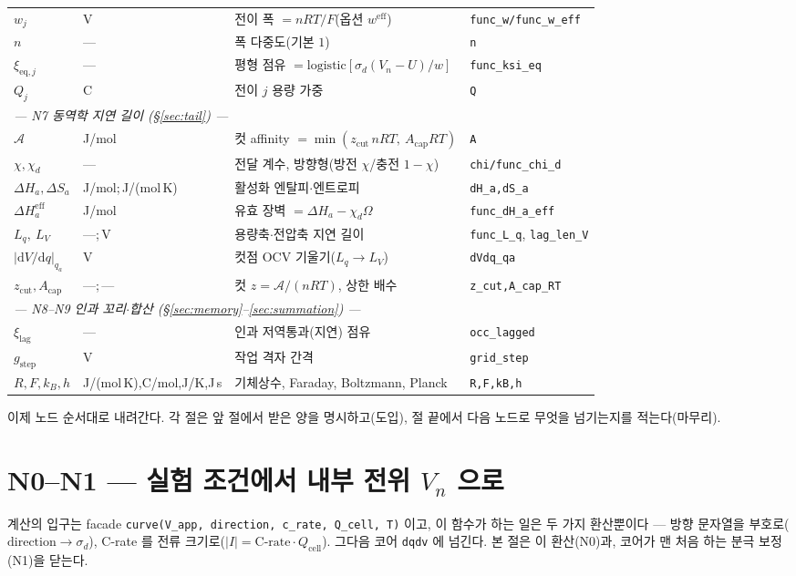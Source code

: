 \documentclass[11pt,a4paper]{article}
\newcommand{\dd}{\mathrm{d}}
\newcommand{\eff}{\mathrm{eff}}
\newcommand{\eq}{\mathrm{eq}}
\newcommand{\cell}{\mathrm{cell}}
\newcommand{\lag}{\mathrm{lag}}
\newcommand{\code}[1]{\texttt{#1}}
\begin{document}
\begin{longtable}{p{} p{} p{} p{}}
$w_j$ & V & 전이 폭 $=nRT/F$(옵션 $w^\eff$) & \code{func\_w/func\_w\_eff} \\
$n$ & --- & 폭 다중도(기본 $1$) & \code{n} \\
$\xi_{\eq,j}$ & --- & 평형 점유 $=\mathrm{logistic}[\sigma_d(V_n-U)/w]$ & \code{func\_ksi\_eq} \\
$Q_j$ & C & 전이 $j$ 용량 가중 & \code{Q} \\
\multicolumn{4}{l}{\emph{— N7 동역학 지연 길이 (§\ref{sec:tail}) —}}\\
$\mathcal A$ & J/mol & 컷 affinity $=\min(z_\mathrm{cut}\,nRT,\ A_\mathrm{cap}RT)$ & \code{A} \\
$\chi,\chi_d$ & --- & 전달 계수, 방향형(방전 $\chi$/충전 $1-\chi$) & \code{chi/func\_chi\_d} \\
$\Delta H_a,\Delta S_a$ & {\footnotesize J/mol;\,J/(mol\,K)} & 활성화 엔탈피$\cdot$엔트로피 & \code{dH\_a,dS\_a} \\
$\Delta H_a^\eff$ & J/mol & 유효 장벽 $=\Delta H_a-\chi_d\Omega$ & \code{func\_dH\_a\_eff} \\
$L_q,\ L_V$ & ---;\,V & 용량축$\cdot$전압축 지연 길이 & \code{func\_L\_q}, \code{lag\_len\_V} \\
$|\dd V/\dd q|_{q_a}$ & V & 컷점 OCV 기울기($L_q\!\to\!L_V$) & \code{dVdq\_qa} \\
$z_\mathrm{cut},A_\mathrm{cap}$ & ---;\,--- & 컷 $z=\mathcal A/(nRT)$, 상한 배수 & \code{z\_cut,A\_cap\_RT} \\
\multicolumn{4}{l}{\emph{— N8--N9 인과 꼬리$\cdot$합산 (§\ref{sec:memory}--\ref{sec:summation}) —}}\\
$\xi_\lag$ & --- & 인과 저역통과(지연) 점유 & \code{occ\_lagged} \\
$g_\mathrm{step}$ & V & 작업 격자 간격 & \code{grid\_step} \\
$R,F,k_B,h$ & {\footnotesize J/(mol\,K),C/mol,J/K,J\,s} & 기체상수, Faraday, Boltzmann, Planck & \code{R,F,kB,h} \\
\bottomrule
\end{longtable}

이제 노드 순서대로 내려간다. 각 절은 앞 절에서 받은 양을 명시하고(도입), 절 끝에서 다음 노드로 무엇을 넘기는지를 적는다(마무리).

\section{N0--N1 — 실험 조건에서 내부 전위 $V_n$ 으로}\label{sec:input}\label{sec:polar}
계산의 입구는 facade \code{curve(V\_app, direction, c\_rate, Q\_cell, T)} 이고, 이 함수가 하는 일은 두 가지 환산뿐이다 — 방향 문자열을 부호로($\text{direction}\to\sigma_d$), C-rate 를 전류 크기로($|I|=\text{C-rate}\cdot Q_\cell$). 그다음 코어 \code{dqdv} 에 넘긴다. 본 절은 이 환산(N0)과, 코어가 맨 처음 하는 분극 보정(N1)을 닫는다.
\end{document}
